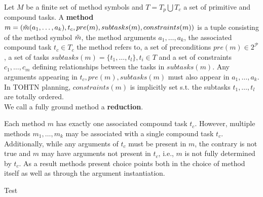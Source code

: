 \begin{definition} %
	Let $M$ be a finite set of method symbols and $T = T_p \bigcup T_c$ a set of primitive and compound tasks. A \textbf{method} $m = (\Tilde{m}(a_1, \ldots, a_k), t_c, pre(m), subtasks(m), constraints(m))$ is a tuple consisting of the method symbol $\Tilde{m}$, the method arguments $a_1, \ldots, a_k$, the associated compound task $t_c \in T_c$ the method refers to, a set of preconditions $pre(m) \in 2^{\mathcal{P}}$, a set of tasks $subtasks(m) = \{t_1, \ldots, t_l\}, t_i \in T$ and a set of constraints $c_1, \ldots, c_m$ defining relationships between the tasks in $subtasks(m)$. Any arguments appearing in $t_c, pre(m), subtasks(m)$ must also appear in $a_1, \ldots, a_k$.\\
	In TOHTN planning, $constraints(m)$ is implicitly set s.t. the subtasks $t_1, \ldots, t_l$ are totally ordered. \\
	We call a fully ground method a \textbf{reduction}.
\end{definition}
Each method $m$ has exactly one associated compound task $t_c$. However, multiple methods $m_1, \ldots, m_k$ may be associated with a single compound task $t_c$. Additionally, while any arguments of $t_c$ must be present in $m$, the contrary is not true and $m$ may have arguments not present in $t_c$, i.e., $m$ is not fully determined by $t_c$. As a result methods present choice points both in the choice of method itself as well as through the argument instantiation. \\


\begin{definition}
	Test
\end{definition}

\